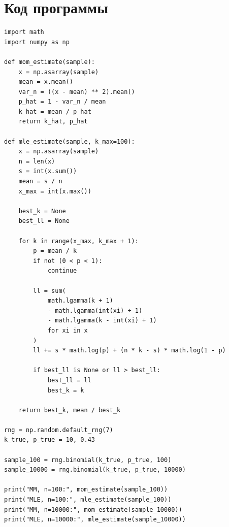 \documentclass[a4paper,14pt]{extarticle}
\begin{document}
\section*{Код программы}


\begin{lstlisting}
import math
import numpy as np

def mom_estimate(sample):
    x = np.asarray(sample)
    mean = x.mean()
    var_n = ((x - mean) ** 2).mean()
    p_hat = 1 - var_n / mean
    k_hat = mean / p_hat
    return k_hat, p_hat

def mle_estimate(sample, k_max=100):
    x = np.asarray(sample)
    n = len(x)
    s = int(x.sum())
    mean = s / n
    x_max = int(x.max())

    best_k = None
    best_ll = None

    for k in range(x_max, k_max + 1):
        p = mean / k
        if not (0 < p < 1):
            continue

        ll = sum(
            math.lgamma(k + 1)
            - math.lgamma(int(xi) + 1)
            - math.lgamma(k - int(xi) + 1)
            for xi in x
        )
        ll += s * math.log(p) + (n * k - s) * math.log(1 - p)

        if best_ll is None or ll > best_ll:
            best_ll = ll
            best_k = k

    return best_k, mean / best_k

rng = np.random.default_rng(7)
k_true, p_true = 10, 0.43

sample_100 = rng.binomial(k_true, p_true, 100)
sample_10000 = rng.binomial(k_true, p_true, 10000)

print("MM, n=100:", mom_estimate(sample_100))
print("MLE, n=100:", mle_estimate(sample_100))
print("MM, n=10000:", mom_estimate(sample_10000))
print("MLE, n=10000:", mle_estimate(sample_10000))
\end{lstlisting}
\end{document}
